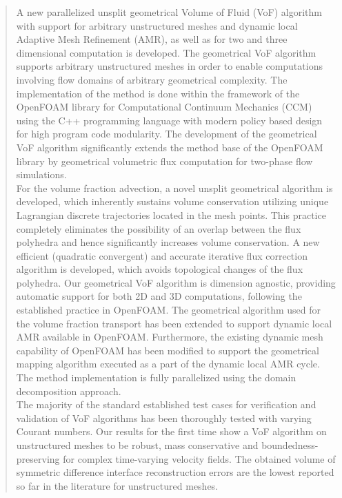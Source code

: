 \documentclass[a4paper,twoside]{amsproc}%
\numberwithin{equation}{section}
\begin{document}
\begin{abstract}
A new parallelized unsplit geometrical Volume of Fluid (VoF) algorithm with support for arbitrary unstructured meshes and dynamic local Adaptive Mesh Refinement (AMR), as well as for two and three dimensional computation is developed. The geometrical VoF algorithm supports arbitrary unstructured meshes in order to enable computations involving flow domains of arbitrary geometrical complexity. The implementation of the method is done within the framework of the OpenFOAM library for Computational Continuum Mechanics (CCM) using the C++ programming language with modern policy based design for high program code modularity. The development of the geometrical VoF algorithm significantly extends the method base of the OpenFOAM library by geometrical volumetric flux computation for two-phase flow simulations.\\[0.5em]
%
For the volume fraction advection, a novel unsplit geometrical algorithm is developed, which inherently sustains volume conservation utilizing unique Lagrangian discrete trajectories located in the mesh points. This practice completely eliminates the possibility of an overlap between the flux polyhedra and hence significantly increases volume conservation. A new efficient (quadratic convergent) and accurate iterative flux correction algorithm is developed, which avoids topological changes of the flux polyhedra. %
Our geometrical VoF algorithm is dimension agnostic, providing automatic support for both 2D and 3D computations, following the established practice in OpenFOAM. %
The geometrical algorithm used for the volume fraction transport has been extended to support dynamic local AMR available in OpenFOAM. Furthermore, the existing dynamic mesh capability of OpenFOAM has been modified to support the geometrical mapping algorithm executed as a part of the dynamic local AMR cycle. The method implementation is fully parallelized using the domain decomposition approach.\\[0.5em]
%
The majority of the standard established test cases for verification and validation of VoF algorithms has been thoroughly tested with varying Courant numbers. Our results for the first time show a VoF algorithm on unstructured meshes to be robust, mass conservative and boundedness-preserving for complex time-varying velocity fields. The obtained volume of symmetric difference interface reconstruction errors are the lowest reported so far in the literature for unstructured meshes.
\end{abstract}
\end{document}
